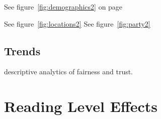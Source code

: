 
See figure~\ref{fig:demographics2} on page \pageref{fig:demographics2}

See figure~\ref{fig:locations2}
See figure~\ref{fig:party2}




\newpage
\subsection{Trends}
descriptive analytics of fairness and trust.




 

  


 

\section{Reading Level Effects}


